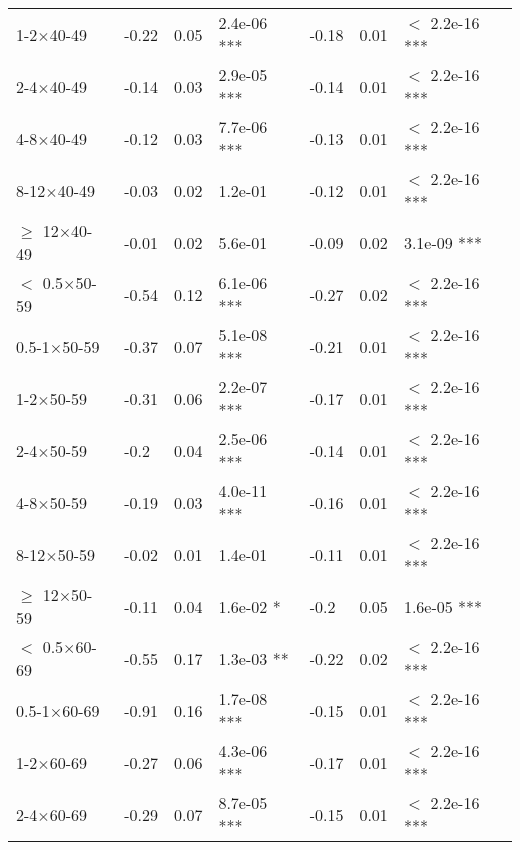 \documentclass{article}\usepackage[utf8]{inputenc}
\begin{document}
\begin{longtable}[t]{lllllll}
\hspace{1em}1-2$\times$40-49 & -0.22 & 0.05 & 2.4e-06 *** & -0.18 & 0.01 & $<$ 2.2e-16 ***\\
\hspace{1em}2-4$\times$40-49 & -0.14 & 0.03 & 2.9e-05 *** & -0.14 & 0.01 & $<$ 2.2e-16 ***\\
\hspace{1em}4-8$\times$40-49 & -0.12 & 0.03 & 7.7e-06 *** & -0.13 & 0.01 & $<$ 2.2e-16 ***\\
\hspace{1em}8-12$\times$40-49 & -0.03 & 0.02 & 1.2e-01 & -0.12 & 0.01 & $<$ 2.2e-16 ***\\
\hspace{1em}$\geq$ 12$\times$40-49 & -0.01 & 0.02 & 5.6e-01 & -0.09 & 0.02 & 3.1e-09 ***\\
\hspace{1em}$<$ 0.5$\times$50-59 & -0.54 & 0.12 & 6.1e-06 *** & -0.27 & 0.02 & $<$ 2.2e-16 ***\\
\hspace{1em}0.5-1$\times$50-59 & -0.37 & 0.07 & 5.1e-08 *** & -0.21 & 0.01 & $<$ 2.2e-16 ***\\
\hspace{1em}1-2$\times$50-59 & -0.31 & 0.06 & 2.2e-07 *** & -0.17 & 0.01 & $<$ 2.2e-16 ***\\
\hspace{1em}2-4$\times$50-59 & -0.2 & 0.04 & 2.5e-06 *** & -0.14 & 0.01 & $<$ 2.2e-16 ***\\
\hspace{1em}4-8$\times$50-59 & -0.19 & 0.03 & 4.0e-11 *** & -0.16 & 0.01 & $<$ 2.2e-16 ***\\
\hspace{1em}8-12$\times$50-59 & -0.02 & 0.01 & 1.4e-01 & -0.11 & 0.01 & $<$ 2.2e-16 ***\\
\hspace{1em}$\geq$ 12$\times$50-59 & -0.11 & 0.04 & 1.6e-02 * & -0.2 & 0.05 & 1.6e-05 ***\\
\hspace{1em}$<$ 0.5$\times$60-69 & -0.55 & 0.17 & 1.3e-03 ** & -0.22 & 0.02 & $<$ 2.2e-16 ***\\
\hspace{1em}0.5-1$\times$60-69 & -0.91 & 0.16 & 1.7e-08 *** & -0.15 & 0.01 & $<$ 2.2e-16 ***\\
\hspace{1em}1-2$\times$60-69 & -0.27 & 0.06 & 4.3e-06 *** & -0.17 & 0.01 & $<$ 2.2e-16 ***\\
\hspace{1em}2-4$\times$60-69 & -0.29 & 0.07 & 8.7e-05 *** & -0.15 & 0.01 & $<$ 2.2e-16 ***\\

\end{longtable}
\end{document}
